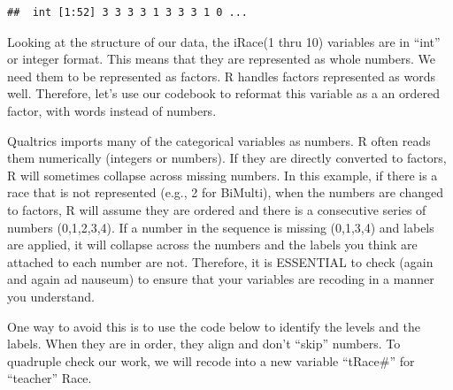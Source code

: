 \documentclass[
]{book}
\newenvironment{Shaded}{\begin{snugshade}}{\end{snugshade}}
\newcommand{\FunctionTok}[1]{\textcolor[rgb]{0.00,0.00,0.00}{#1}}
\newcommand{\NormalTok}[1]{#1}
\newcommand{\SpecialCharTok}[1]{\textcolor[rgb]{0.00,0.00,0.00}{#1}}
\begin{document}
\begin{Shaded}
\end{Shaded}

\begin{verbatim}
##  int [1:52] 3 3 3 3 1 3 3 3 1 0 ...
\end{verbatim}

Looking at the structure of our data, the iRace(1 thru 10) variables are in ``int'' or integer format. This means that they are represented as whole numbers. We need them to be represented as factors. R handles factors represented as words well. Therefore, let's use our codebook to reformat this variable as a an ordered factor, with words instead of numbers.

Qualtrics imports many of the categorical variables as numbers. R often reads them numerically (integers or numbers). If they are directly converted to factors, R will sometimes collapse across missing numbers. In this example, if there is a race that is not represented (e.g., 2 for BiMulti), when the numbers are changed to factors, R will assume they are ordered and there is a consecutive series of numbers (0,1,2,3,4). If a number in the sequence is missing (0,1,3,4) and labels are applied, it will collapse across the numbers and the labels you think are attached to each number are not. Therefore, it is ESSENTIAL to check (again and again ad nauseum) to ensure that your variables are recoding in a manner you understand.

One way to avoid this is to use the code below to identify the levels and the labels. When they are in order, they align and don't ``skip'' numbers. To quadruple check our work, we will recode into a new variable ``tRace\#'' for ``teacher'' Race.
\end{document}
